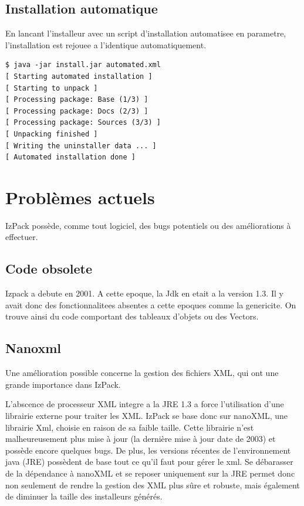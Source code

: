 \subsection{Installation automatique}
En lancant l'installeur avec un script d'installation automatisee en parametre, l'installation est rejouee a l'identique automatiquement.
\begin{verbatim}
$ java -jar install.jar automated.xml
[ Starting automated installation ]
[ Starting to unpack ]
[ Processing package: Base (1/3) ]
[ Processing package: Docs (2/3) ]
[ Processing package: Sources (3/3) ]
[ Unpacking finished ]
[ Writing the uninstaller data ... ]
[ Automated installation done ]
\end{verbatim}


\section{Problèmes actuels}
IzPack possède, comme tout logiciel, des bugs potentiels ou des améliorations à effectuer.
\subsection{Code obsolete}
Izpack a debute en 2001. A cette epoque, la Jdk en etait a la version 1.3. Il y avait donc des fonctionnalitees absentes a cette epoques comme la genericite. On trouve ainsi du code comportant des tableaux d'objets ou des Vectors.
\subsection{Nanoxml}
Une amélioration possible concerne la gestion des fichiers XML, qui ont une grande importance dans IzPack.

L'abscence de processeur XML integre a la JRE 1.3 a force l'utilisation d'une librairie externe pour traiter les XML. IzPack se base donc sur nanoXML, une librairie Xml, choisie en raison de sa faible taille.
Cette librairie n'est malheureusement plus mise à jour (la dernière mise à jour date de 2003) et possède encore quelques bugs.
De plus, les versions récentes de l'environnement java (JRE) possèdent de base tout ce qu'il faut pour gérer le xml.
Se débarasser de la dépendance à nanoXML et se reposer uniquement sur la JRE permet donc non seulement de rendre la gestion des XML plus sûre et robuste, mais également de diminuer la taille des installeurs générés.
